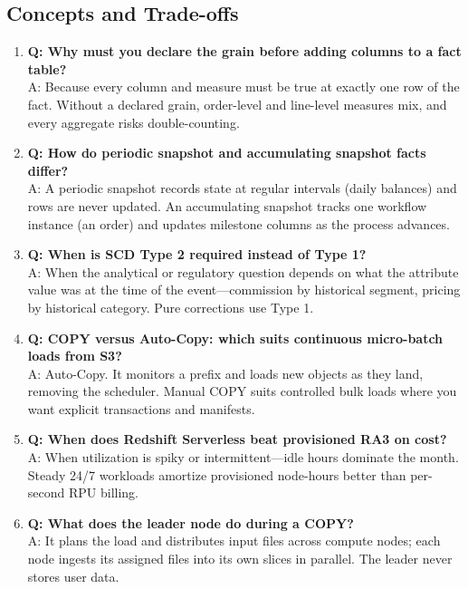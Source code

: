 \subsection{Concepts and Trade-offs}
\begin{enumerate}
    \item \textbf{Q: Why must you declare the grain before adding columns to a fact table?}\\
    A: Because every column and measure must be true at exactly one row of the fact. Without a declared grain, order-level and line-level measures mix, and every aggregate risks double-counting.
    \item \textbf{Q: How do periodic snapshot and accumulating snapshot facts differ?}\\
    A: A periodic snapshot records state at regular intervals (daily balances) and rows are never updated. An accumulating snapshot tracks one workflow instance (an order) and updates milestone columns as the process advances.
    \item \textbf{Q: When is SCD Type 2 required instead of Type 1?}\\
    A: When the analytical or regulatory question depends on what the attribute value was at the time of the event---commission by historical segment, pricing by historical category. Pure corrections use Type 1.
    \item \textbf{Q: COPY versus Auto-Copy: which suits continuous micro-batch loads from S3?}\\
    A: Auto-Copy. It monitors a prefix and loads new objects as they land, removing the scheduler. Manual COPY suits controlled bulk loads where you want explicit transactions and manifests.
    \item \textbf{Q: When does Redshift Serverless beat provisioned RA3 on cost?}\\
    A: When utilization is spiky or intermittent---idle hours dominate the month. Steady 24/7 workloads amortize provisioned node-hours better than per-second RPU billing.
    \item \textbf{Q: What does the leader node do during a COPY?}\\
    A: It plans the load and distributes input files across compute nodes; each node ingests its assigned files into its own slices in parallel. The leader never stores user data.
\end{enumerate}

